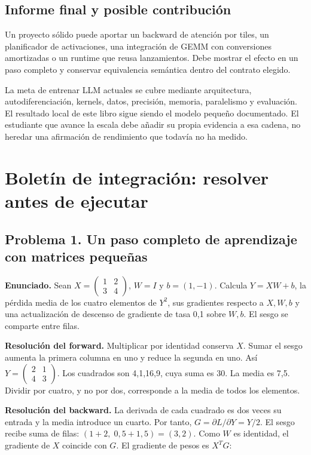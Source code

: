 \documentclass[12pt,a4paper,oneside]{report}
\begin{document}
\section{Informe final y posible contribución}
Un proyecto sólido puede aportar un backward de atención por tiles, un planificador de activaciones, una integración de GEMM con conversiones amortizadas o un runtime que reusa lanzamientos. Debe mostrar el efecto en un paso completo y conservar equivalencia semántica dentro del contrato elegido.

La meta de entrenar LLM actuales se cubre mediante arquitectura, autodiferenciación, kernels, datos, precisión, memoria, paralelismo y evaluación. El resultado local de este libro sigue siendo el modelo pequeño documentado. El estudiante que avance la escala debe añadir su propia evidencia a esa cadena, no heredar una afirmación de rendimiento que todavía no ha medido.


\chapter{Boletín de integración: resolver antes de ejecutar}
\label{ch:boletin-final}
\section{Problema 1. Un paso completo de aprendizaje con matrices pequeñas}
\textbf{Enunciado.} Sean $X=\left(\begin{smallmatrix}1&2\\3&4\end{smallmatrix}\right)$, $W=I$ y $b=(1,-1)$. Calcula $Y=XW+b$, la pérdida media de los cuatro elementos de $Y^2$, sus gradientes respecto a $X,W,b$ y una actualización de descenso de gradiente de tasa 0,1 sobre $W,b$. El sesgo se comparte entre filas.

\textbf{Resolución del forward.} Multiplicar por identidad conserva $X$. Sumar el sesgo aumenta la primera columna en uno y reduce la segunda en uno. Así $Y=\left(\begin{smallmatrix}2&1\\4&3\end{smallmatrix}\right)$. Los cuadrados son 4,1,16,9, cuya suma es 30. La media es 7,5. Dividir por cuatro, y no por dos, corresponde a la media de todos los elementos.

\textbf{Resolución del backward.} La derivada de cada cuadrado es dos veces su entrada y la media introduce un cuarto. Por tanto, $G=\partial L/\partial Y=Y/2$. El sesgo recibe suma de filas: $(1+2,\;0,5+1,5)=(3,2)$. Como $W$ es identidad, el gradiente de $X$ coincide con $G$. El gradiente de pesos es $X^TG$:
\end{document}
